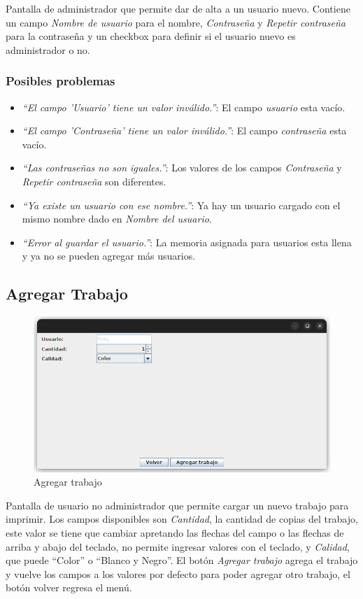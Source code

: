 \documentclass{article}
\begin{document}
Pantalla de administrador que permite dar de alta a un usuario nuevo. Contiene un campo \emph{Nombre de usuario} para el nombre, \emph{Contraseña} y \emph{Repetir contraseña} para la contraseña y un checkbox para definir si el usuario nuevo es administrador o no.

\subsubsection*{Posibles problemas}

\begin{itemize}
    \item \emph{``El campo 'Usuario' tiene un valor inválido.''}: El campo \emph{usuario} esta vacío.
    \item \emph{``El campo 'Contraseña' tiene un valor inválido.''}: El campo \emph{contraseña} esta vacío.
    \item \emph{``Las contraseñas no son iguales.''}: Los valores de los campos \emph{Contraseña} y \emph{Repetir contraseña} son diferentes.
    \item \emph{``Ya existe un usuario con ese nombre.''}: Ya hay un usuario cargado con el mismo nombre dado en \emph{Nombre del usuario}.
    \item \emph{``Error al guardar el usuario.''}: La memoria asignada para usuarios esta llena y ya no se pueden agregar más usuarios.
\end{itemize}

\subsection{Agregar Trabajo}

\begin{figure}[h]
    \centering
    \includegraphics[width=0.7\linewidth,keepaspectratio]{add-print.png}
    \caption{Agregar trabajo}
\end{figure}

Pantalla de usuario no administrador que permite cargar un nuevo trabajo para imprimir. Los campos disponibles son \emph{Cantidad}, la cantidad de copias del trabajo, este valor se tiene que cambiar apretando las flechas del campo o las flechas de arriba y abajo del teclado, no permite ingresar valores con el teclado, y \emph{Calidad}, que puede ``Color'' o ``Blanco y Negro''. El botón \emph{Agregar trabajo} agrega el trabajo y vuelve los campos a los valores por defecto para poder agregar otro trabajo, el botón volver regresa el menú.
\end{document}
